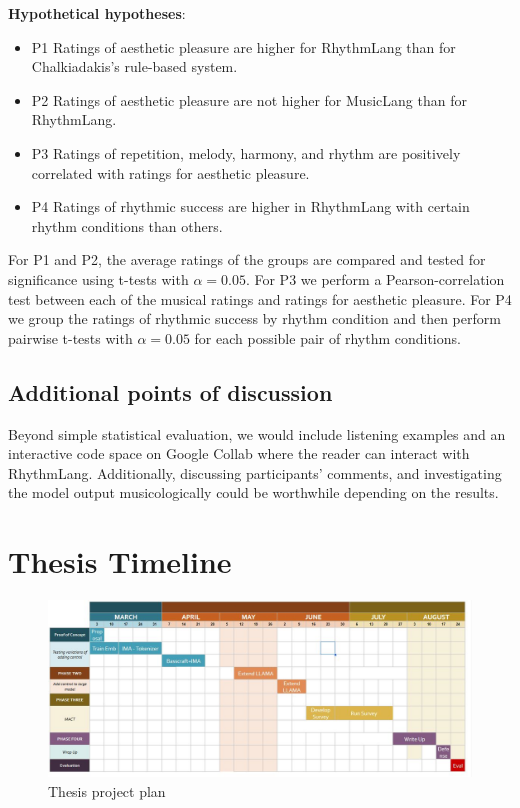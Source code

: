 \textbf{Hypothetical hypotheses}: 
\begin{itemize}
\item{P1} Ratings of aesthetic pleasure are higher for RhythmLang than for Chalkiadakis's rule-based system.
\item{P2} Ratings of aesthetic pleasure are not higher for MusicLang than for RhythmLang. 
\item{P3} Ratings of repetition, melody, harmony, and rhythm are positively correlated with ratings for aesthetic pleasure.
\item{P4} Ratings of rhythmic success are higher in RhythmLang with certain rhythm conditions than others.
\end{itemize}

For P1 and P2, the average ratings of the groups are compared and tested for significance using t-tests with $\alpha=0.05$. 
For P3 we perform a Pearson-correlation test between each of the musical ratings and ratings for aesthetic pleasure.
For P4 we group the ratings of rhythmic success by rhythm condition and then perform pairwise t-tests with $\alpha=0.05$ for each possible pair of rhythm conditions. 


\subsection{Additional points of discussion}
Beyond simple statistical evaluation, we would include listening examples and an interactive code space on Google Collab where the reader can interact with RhythmLang. Additionally, discussing participants' comments, and investigating the model output musicologically could be worthwhile depending on the results. 
\section{Thesis Timeline}

\begin{figure}[H]
    \centering
    \includegraphics[width=1\textwidth]{IMAGES/project_plan.jpg} 
    \caption{Thesis project plan}
    \label{fig:projectplan}
\end{figure}



